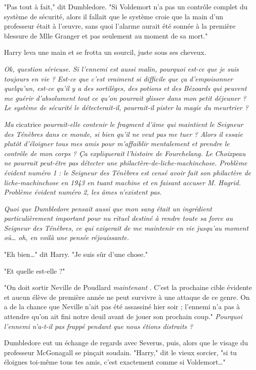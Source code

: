 "Pas tout à fait," dit Dumbledore. "Si Voldemort n'a pas un contrôle complet du système de sécurité, alors il fallait que le système croie que la main d'un professeur était à l'œuvre, sans quoi l'alarme aurait été sonnée à la première blessure de Mlle Granger et pas seulement au moment de sa mort."

Harry leva une main et se frotta un sourcil, juste sous ses cheveux.

\emph{Ok, question sérieuse. Si l'ennemi est aussi malin, pourquoi est-ce que je suis toujours en vie ? Est-ce que c'est vraiment si difficile que ça d'empoisonner quelqu'un, est-ce qu'il y a des sortilèges, des potions et des Bézoards qui peuvent me guérir d'absolument tout ce qu'on pourrait glisser dans mon petit déjeuner ? Le système de sécurité le détecterait-il, pourrait-il pister la magie du meurtrier ?} 

\emph{Ma}  cicatrice \emph{pourrait-elle contenir le fragment d'âme qui maintient le Seigneur des Ténèbres dans ce monde, si bien qu'il ne veut pas me tuer ? Alors il essaie plutôt d'éloigner tous mes amis pour m'affaiblir mentalement et prendre le contrôle de mon corps ? Ça expliquerait l'histoire de Fourchelang. Le Choixpeau ne pourrait peut-être pas détecter une philactère-de-liche-machinchose. Problème évident numéro 1 : le Seigneur des Ténèbres est censé avoir fait son philactère de liche-machinchose en 1943 en tuant machine et en faisant accuser M. Hagrid. Problème évident numéro 2, les âmes n'existent pas.} 

\emph{Quoi que Dumbledore pensait aussi que mon sang était un ingrédient particulièrement important pour nu rituel destiné à rendre toute sa force au Seigneur des Ténèbres, ce qui exigerait de me maintenir en vie jusqu'au moment où… oh, en voilà une pensée réjouissante.} 

"Eh bien…" dit Harry. "Je suis sûr d'une chose."

"Et quelle est-elle ?"

"On doit sortir Neville de Poudlard \emph{maintenant} . C'est la prochaine cible évidente et aucun élève de première année ne peut survivre à une attaque de ce genre. On a de la chance que Neville n'ait pas été assassiné hier soir ; l'ennemi n'a pas à attendre qu'on ait fini notre deuil avant de jouer son prochain coup." \emph{Pourquoi l'ennemi n'a-t-il pas frappé pendant que nous étions distraits ?} 

Dumbledore eut un échange de regards avec Severus, puis, alors que le visage du professeur McGonagall se pinçait soudain. "Harry," dit le vieux sorcier, "si tu éloignes toi-même tous tes amis, c'est exactement comme si Voldemort…"

